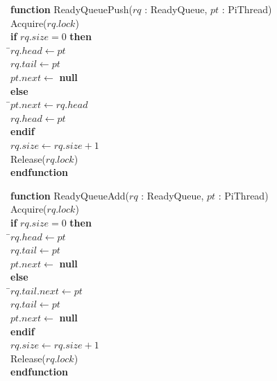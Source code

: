 \documentclass[a4paper,11pt]{article}
\newenvironment{program}{
  \begin{sffamily}
  \begin{scriptsize}
  \begin{tabbing}}
 {\end{tabbing}
  \end{scriptsize}
  \end{sffamily}}
\newcommand{\kw}[1]{\textsf{\textbf{#1}}}
\newcommand{\pindent}{\hspace{2em}\=}
\newcommand{\synchro}[1]{\textcolor{synchrocolor}{#1}}
\begin{document}
\label{ReadyQueuePush}
\begin{program}
  \kw{function} ReadyQueuePush($rq$ : ReadyQueue, $pt$ : PiThread) \\
  \pindent\synchro{Acquire($rq.lock$)} \\
  \>\kw{if} $rq.size = 0$ \kw{then} \\
  \>\pindent$rq.head \leftarrow pt$ \\
  \>\>$rq.tail \leftarrow pt$ \\
  \>\>$pt.next \leftarrow$ \kw{null} \\
  \>\kw{else} \\
  \>\pindent$pt.next \leftarrow rq.head$ \\
  \>\>$rq.head \leftarrow pt$ \\
  \>\kw{endif} \\
  \>$rq.size \leftarrow rq.size + 1$ \\
  \>\synchro{Release($rq.lock$)} \\
  \kw{endfunction}
\end{program}

\label{ReadyQueueAdd}
\begin{program}
  \kw{function} ReadyQueueAdd($rq$ : ReadyQueue, $pt$ : PiThread) \\
  \pindent\synchro{Acquire($rq.lock$)} \\
  \>\kw{if} $rq.size = 0$ \kw{then} \\
  \>\pindent$rq.head \leftarrow pt$ \\
  \>\>$rq.tail \leftarrow pt$ \\
  \>\>$pt.next \leftarrow$ \kw{null} \\
  \>\kw{else} \\
  \>\pindent$rq.tail.next \leftarrow pt$ \\
  \>\>$rq.tail \leftarrow pt$ \\
  \>\>$pt.next \leftarrow$ \kw{null} \\
  \>\kw{endif} \\
  \>$rq.size \leftarrow rq.size + 1$ \\
  \>\synchro{Release($rq.lock$)} \\
  \kw{endfunction}
\end{program}
\end{document}
